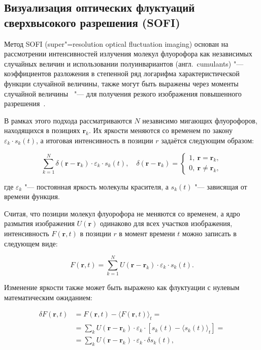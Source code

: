 \subsection{Визуализация оптических флуктуаций сверхвысокого разрешения (SOFI)}

Метод SOFI (super"=resolution optical fluctuation imaging) основан на рассмотрении интенсивностей излучения молекул флуорофора как независимых случайных величин и использовании полуинвариантов (англ.~cumulants) "--- коэффициентов разложения в степенной ряд логарифма характеристической функции случайной величины, также могут быть выражены через моменты случайной величины~\cite{75086, малахов1978кумулянтный} "--- для получения резкого изображения повышенного разрешения~\cite{dertinger2009fast,dertinger2010achieving}.

В рамках этого подхода рассматриваются $N$ независимо мигающих флуорофоров, находящихся в позициях $\mathbf{r}_k$. Их яркости меняются со временем по закону $\varepsilon_k\cdot s_k(t)$, а итоговая интенсивность в позиции $r$ задаётся следующим образом:

\begin{equation}
	\sum_{k=1}^{N}{\delta(\mathbf{r}-\mathbf{r}_k)\cdot\varepsilon_k\cdot s_k(t)}, \quad \delta\left(\mathbf{r}-\mathbf{r}_k\right)=
	\begin{cases}
		1,\ \mathbf{r}=\mathbf{r}_k, \\
		0,\ \mathbf{r}\neq\mathbf{r}_k,
	\end{cases} \nonumber
\end{equation}	

\noindent где $\varepsilon_k$ "--- постоянная яркость молекулы красителя, а $s_k(t)$ "--- зависящая от времени функция.

Считая, что позиции молекул флуорофора не меняются со временем, а ядро размытия изображения $U(\mathbf{r})$ одинаково для всех участков изображения, интенсивность $F(\mathbf{r},t)$ в позиции $r$ в момент времени $t$ можно записать в следующем виде:

\begin{equation}
	F\left(\mathbf{r},t\right)=\sum_{k=1}^{N}{U(\mathbf{r}-\mathbf{r}_k)\cdot\varepsilon_k\cdot s_k(t)}. \nonumber
\end{equation}

Изменение яркости также может быть выражено как флуктуации с нулевым математическим ожиданием:

\begin{align*}
	\delta F\left(\mathbf{r},t\right) &= F\left(\mathbf{r},t\right)-\langle F\left(\mathbf{r},t\right) \rangle_t = \\
	&= \sum_{k} {U\left(\mathbf{r} - \mathbf{r}_k\right) \cdot \varepsilon_k \cdot \left[ s_k\left(t\right)- \langle s_k\left(t\right) \rangle_t \right]} = \\
	&= \sum_{k} {U\left(\mathbf{r} - \mathbf{r}_k\right) \cdot \varepsilon_k \cdot \delta s_k \left(t\right)},
\end{align*}

